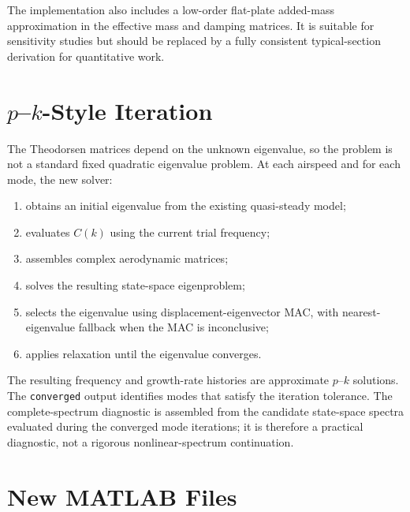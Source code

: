 \documentclass[11pt]{article}
\begin{document}
The implementation also includes a low-order flat-plate added-mass approximation in the
effective mass and damping matrices. It is suitable for sensitivity studies but should
be replaced by a fully consistent typical-section derivation for quantitative work.

\section{$p$--$k$-Style Iteration}

The Theodorsen matrices depend on the unknown eigenvalue, so the problem is not a
standard fixed quadratic eigenvalue problem. At each airspeed and for each mode, the
new solver:
\begin{enumerate}
\item obtains an initial eigenvalue from the existing quasi-steady model;
\item evaluates $C(k)$ using the current trial frequency;
\item assembles complex aerodynamic matrices;
\item solves the resulting state-space eigenproblem;
\item selects the eigenvalue using displacement-eigenvector MAC, with nearest-eigenvalue
 fallback when the MAC is inconclusive;
\item applies relaxation until the eigenvalue converges.
\end{enumerate}

The resulting frequency and growth-rate histories are approximate $p$--$k$ solutions.
The \texttt{converged} output identifies modes that satisfy the iteration tolerance.
The complete-spectrum diagnostic is assembled from the candidate state-space spectra
evaluated during the converged mode iterations; it is therefore a practical diagnostic,
not a rigorous nonlinear-spectrum continuation.

\section{New MATLAB Files}
\end{document}
